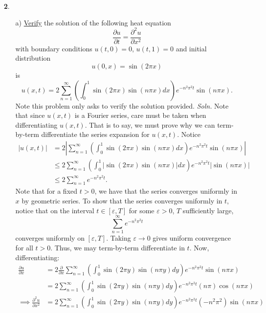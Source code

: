 \documentclass{article}
\begin{document}
\begin{itemize}
\item[\textbf{2}.] 
    \begin{itemize}
        \item[a)] \underline{Verify} the solution of the following heat equation
        \[\frac{\partial u}{\partial t} = \frac{\partial^2u}{\partial x^2}\]
        with boundary conditions $u(t,0) = 0$, $u(t,1) = 0$ and initial distribution
        \[u(0,x) = \sin(2\pi x)\]
        is
        \[u(x,t) = 2\sum_{n = 1}^{\infty} \left(\int_0^1 \sin(2\pi x)\sin(n\pi x)dx\right)e^{-n^2 \pi^2t}\sin(n\pi x).\]
        Note this problem only asks to verify the solution provided.
        \newline\newline
    \textit{Soln.} Note that since $u(x,t)$ is a Fourier series, care must be taken when differentiating $u(x,t)$. That is to say, we must prove why we can term-by-term differentiate the series expansion for $u(x,t)$. Notice 
    \begin{align*}
        |u(x,t)| &= 2\left|\sum_{n = 1}^{\infty} \left(\int_0^1\sin(2\pi x)\sin(n \pi x)dx\right)e^{-n^2 \pi^2t}\sin(n \pi x)\right|\\
        &\leq 2\sum_{n=1}^{\infty} \left(\int_0^1|\sin(2\pi x)\sin(n \pi x)|dx\right)e^{-n^2 \pi^2 t}|\sin(n\pi x)|\\
        &\leq 2\sum_{n = 1}^{\infty} e^{-n^2 \pi^2t}.
    \end{align*}
    Note that for a fixed $t > 0$, we have that the series converges uniformly in $x$ by geometric series. To show that the series converges uniformly in $t$, notice that on the interval $t \in [\varepsilon, T]$ for some $\varepsilon > 0$, $T$ sufficiently large, 
    \[\sum_{n = 1}^{\infty} e^{-n^2\pi^2 t}\]
    converges uniformly on $[\varepsilon,T]$. Taking $\varepsilon \to 0$ gives uniform convergence for all $t > 0$. Thus, we may term-by-term differentiate in $t$. Now, differentiating:
    \begin{align*}
        \frac{\partial u}{\partial x} &= 2\frac{\partial}{\partial x}\sum_{n = 1}^{\infty} \left(\int_0^1\sin(2\pi y)\sin(n\pi y)dy\right)e^{-n^2\pi^2t}\sin(n\pi x)\\
        &= 2\sum_{n = 1}^{\infty} \left(\int_0^1 \sin(2\pi y) \sin(n \pi y)dy\right)e^{-n^2\pi^2t}(n\pi)\cos(n\pi x)\\
        \implies \frac{\partial^2u}{\partial x^2} &= 2\sum_{n = 1}^{\infty} \left(\int_0^1 \sin(2\pi y)\sin(n\pi y)dy \right)e^{-n^2\pi^2t}(-n^2\pi^2)\sin(n\pi x)
    \end{align*}

\end{itemize}
\end{itemize}
\end{document}
